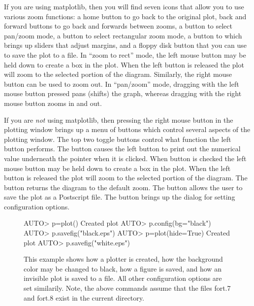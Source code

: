 \documentclass[12pt]{report}
\begin{document}
 If you are using matplotlib, then you will find seven icons that allow
 you to use various zoom functions: a home button to go back to the
 original plot, back and forward buttons to go back and forwards
 between zooms, a button to select pan/zoom mode, a button to select
 rectangular zoom mode, a button to which brings up sliders that
 adjust margins, and a floppy disk button that you can use
 to save the plot to a file. 
 In ``zoom to rect'' mode, the left mouse button may be held down to create
 a box in the plot.  When the left button is released the plot will
 zoom to the selected portion of the diagram. Similarly, the right
 mouse button can be used to zoom out. In ``pan/zoom'' mode, dragging
 with the left mouse button pressed pans (shifts) the graph, whereas
 dragging with the right mouse button zooms in and out.

 If you are \emph{not} using matplotlib, then
 pressing the right mouse button in the plotting window brings
 up a menu of buttons which control several aspects
 of the plotting window.  The top two toggle buttons
 control what function the left button performs.  
 The  button causes the
 left button to print out the numerical value underneath
 the pointer when it is clicked.
 When  button is checked the left
 mouse button may be held down to create
 a box in the plot.  When the left button
 is released the plot will zoom to the selected
 portion of the diagram.
 The  button returns the
 diagram to the default zoom. 
 The  button allows the user
 to save the plot as a Postscript file.
 The  button brings up
 the dialog for setting configuration options.

 \begin{figure}[htbp]
 {\small \begin{center} \begin{boxedverbatim} 
 AUTO> p=plot()
 Created plot
 AUTO> p.config(bg="black")
 AUTO> p.savefig("black.eps")
 AUTO> p=plot(hide=True)
 Created plot
 AUTO> p.savefig("white.eps")
 \end{boxedverbatim}
 \end{center} 
 }
 \caption[Configuring a plotter.]
 {This example shows how a plotter is created,
 how the background color may be changed to black,
 how a figure is saved, and how an invisible plot is
 saved to a file.
 All other configuration options are set similarily.
 Note, the above commands assume that the files
 fort.7 and fort.8 exist in the current directory.
 }
 \label{exa:plotter_example}
 \end{figure}
\end{document}
